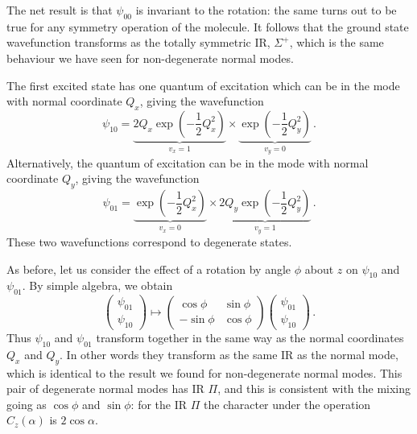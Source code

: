 \documentclass{article}
\theoremstyle{plain}\theoremheaderfont{\normalfont\itshape}\theorembodyfont{\rmfamily}\theoremseparator{.}\newtheorem*{rem}{Remark}\newtheorem*{ex}{Example}\newtheorem*{proof}{Proof}\newtheorem*{altp}{Alternative proof}
\theoremstyle{plain}\theoremheaderfont{\normalfont\bfseries}\theorembodyfont{\rmfamily}\theoremseparator{.}\newtheorem{thm}{Theorem}[section]\newtheorem{lem}[thm]{Lemma}\newtheorem{prop}[thm]{Proposition}\newtheorem*{cor}{Corollary}\newtheorem{defn}[thm]{Definition}\newtheorem{clm}[thm]{Claim}\newtheorem{clminproof}{Claim}\newtheorem{pos}{Postulate}[section]
\theoremstyle{break}\theoremheaderfont{\normalfont\itshape}\theorembodyfont{\rmfamily}\theoremseparator{.\medskip}\newtheorem*{proofskip}{Proof}\newtheorem*{exs}{Examples}\newtheorem*{rems}{Remarks}
\theoremstyle{break}\theoremheaderfont{\normalfont\bfseries}\theorembodyfont{\rmfamily}\theoremseparator{.\medskip}\newtheorem{lemskip}[thm]{Lemma}\newtheorem{defnskip}[thm]{Definition}\newtheorem{propskip}[thm]{Proposition}\newtheorem{thmskip}[thm]{Theorem}
\numberwithin{equation}{section}
\begin{document}
    The net result is that \(\psi_{00}\) is invariant to the rotation: the same turns out to be true for any symmetry operation of the molecule. It follows that the ground state wavefunction transforms as the totally symmetric IR, \(\Sigma^+\), which is the same behaviour we have seen for non-degenerate normal modes.

    The first excited state has one quantum of excitation which can be in the mode with normal coordinate \(Q_x\), giving the wavefunction
    \begin{equation}
        \psi_{10}=\underbrace{2Q_x\exp\left(-\frac{1}{2}Q_x^2\right)}_{v_x=1}\times\underbrace{\exp\left(-\frac{1}{2}Q_y^2\right)}_{v_y=0}\,.
    \end{equation}
    Alternatively, the quantum of excitation can be in the mode with normal coordinate \(Q_y\), giving the wavefunction
    \begin{equation}
        \psi_{01}=\underbrace{\exp\left(-\frac{1}{2}Q_x^2\right)}_{v_x=0}\times\underbrace{2Q_y\exp\left(-\frac{1}{2}Q_y^2\right)}_{v_y=1}\,.
    \end{equation}
    These two wavefunctions correspond to degenerate states.

    As before, let us consider the effect of a rotation by angle \(\phi\) about \(z\) on \(\psi_{10}\) and \(\psi_{01}\). By simple algebra, we obtain
    \begin{equation}
        \begin{pmatrix}
            \psi_{01} \\ \psi_{10}
        \end{pmatrix}\longmapsto\begin{pmatrix}
            \cos\phi & \sin\phi \\
            -\sin\phi & \cos\phi
        \end{pmatrix}\begin{pmatrix}
            \psi_{01} \\ \psi_{10}
        \end{pmatrix}\,.
    \end{equation} 
    Thus \(\psi_{10}\) and \(\psi_{01}\) transform together in the same way as the normal coordinates \(Q_x\) and \(Q_y\). In other words they transform as the same IR as the normal mode, which is identical to the result we found for non-degenerate normal modes. This pair of degenerate normal modes has IR \(\Pi\), and this is consistent with the mixing going as \(\cos\phi\) and \(\sin\phi\): for the IR \(\Pi\) the character under the operation \(C_z(\alpha)\) is \(2\cos\alpha\).
\end{document}
